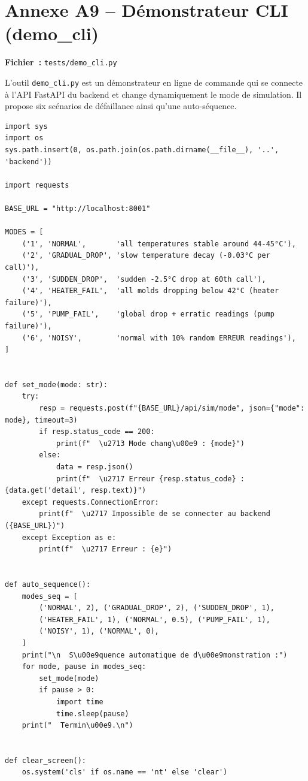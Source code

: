 \section{Annexe A9 -- Démonstrateur CLI (demo\_cli)}
\label{annexe:demo_cli}

\textbf{Fichier~:} \texttt{tests/demo\_cli.py}

L'outil \texttt{demo\_cli.py} est un démonstrateur en ligne de commande qui se connecte à l'API FastAPI du backend et change dynamiquement le mode de simulation. Il propose six scénarios de défaillance ainsi qu'une auto-séquence.

\begin{lstlisting}
import sys
import os
sys.path.insert(0, os.path.join(os.path.dirname(__file__), '..', 'backend'))

import requests

BASE_URL = "http://localhost:8001"

MODES = [
    ('1', 'NORMAL',       'all temperatures stable around 44-45°C'),
    ('2', 'GRADUAL_DROP', 'slow temperature decay (-0.03°C per call)'),
    ('3', 'SUDDEN_DROP',  'sudden -2.5°C drop at 60th call'),
    ('4', 'HEATER_FAIL',  'all molds dropping below 42°C (heater failure)'),
    ('5', 'PUMP_FAIL',    'global drop + erratic readings (pump failure)'),
    ('6', 'NOISY',        'normal with 10% random ERREUR readings'),
]


def set_mode(mode: str):
    try:
        resp = requests.post(f"{BASE_URL}/api/sim/mode", json={"mode": mode}, timeout=3)
        if resp.status_code == 200:
            print(f"  \u2713 Mode chang\u00e9 : {mode}")
        else:
            data = resp.json()
            print(f"  \u2717 Erreur {resp.status_code} : {data.get('detail', resp.text)}")
    except requests.ConnectionError:
        print(f"  \u2717 Impossible de se connecter au backend ({BASE_URL})")
    except Exception as e:
        print(f"  \u2717 Erreur : {e}")


def auto_sequence():
    modes_seq = [
        ('NORMAL', 2), ('GRADUAL_DROP', 2), ('SUDDEN_DROP', 1),
        ('HEATER_FAIL', 1), ('NORMAL', 0.5), ('PUMP_FAIL', 1),
        ('NOISY', 1), ('NORMAL', 0),
    ]
    print("\n  S\u00e9quence automatique de d\u00e9monstration :")
    for mode, pause in modes_seq:
        set_mode(mode)
        if pause > 0:
            import time
            time.sleep(pause)
    print("  Termin\u00e9.\n")


def clear_screen():
    os.system('cls' if os.name == 'nt' else 'clear')



\end{lstlisting}
